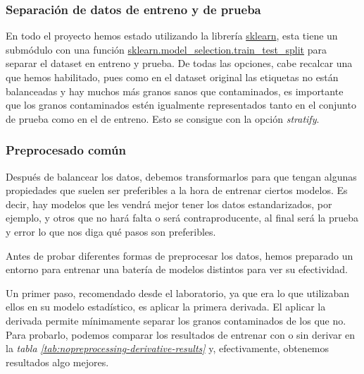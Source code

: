 \subsubsection{Separación de datos de entreno y de prueba}

En todo el proyecto hemos estado utilizando la librería \href{https://scikit-learn.org/stable/}{sklearn}, esta tiene un submódulo con una función \href{https://scikit-learn.org/stable/modules/generated/sklearn.model_selection.train_test_split.html}{sklearn.model\_selection.train\_test\_split} para separar el \gls{dataset} en entreno y prueba. De todas las opciones, cabe recalcar una que hemos habilitado, pues como en el \gls{dataset} original las etiquetas no están balanceadas y hay muchos más granos sanos que contaminados, es importante que los granos contaminados estén igualmente representados tanto en el conjunto de prueba como en el de entreno. Esto se consigue con la opción \textit{stratify}.


\subsubsection{Preprocesado común}

Después de balancear los datos, debemos transformarlos para que tengan algunas propiedades que suelen ser preferibles a la hora de entrenar ciertos modelos. Es decir, hay modelos que les vendrá mejor tener los datos estandarizados, por ejemplo, y otros que no hará falta o será contraproducente, al final será la prueba y error lo que nos diga qué pasos son preferibles.

Antes de probar diferentes formas de preprocesar los datos, hemos preparado un entorno para entrenar una batería de modelos distintos para ver su efectividad.

Un primer paso, recomendado desde el laboratorio, ya que era lo que utilizaban ellos en su modelo estadístico, es aplicar la primera derivada. El aplicar la derivada permite mínimamente separar los granos contaminados de los que no. Para probarlo, podemos comparar los resultados de entrenar con o sin derivar en la \textit{tabla \ref{tab:nopreprocessing-derivative-results}} y, efectivamente, obtenemos resultados algo mejores.

